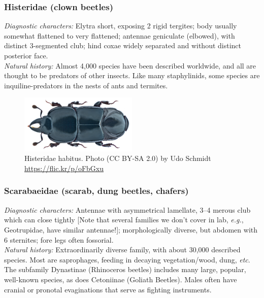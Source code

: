 \documentclass[letterpaper, 11pt]{article}
\begin{document}
\subsubsection{Histeridae (clown beetles)}
\noindent{}\textit{Diagnostic characters:} Elytra short, exposing 2 rigid tergites; body usually somewhat flattened to very flattened; antennae geniculate (elbowed), with distinct 3-segmented club; hind coxae widely separated and without distinct posterior face.\\

\noindent{}\textit{Natural history:} Almost 4,000 species have been described worldwide, and all are thought to be predators of other insects. Like many staphylinids, some species are inquiline-predators in the nests of ants and termites.

\begin{figure}[ht!]
  \centering
    \includegraphics[width=0.5\textwidth]{HisteridHabitus}
  \caption{Histeridae habitus. Photo (CC BY-SA 2.0) by Udo Schmidt \url{https://flic.kr/p/oFbGxu}}
  \label{fig:histerid}
\end{figure}

\subsubsection{Scarabaeidae (scarab, dung beetles, chafers)}
\noindent{}\textit{Diagnostic characters:} Antennae with asymmetrical lamellate, 3--4 merous club which can close tightly [Note that several families we don't cover in lab, \textit{e.g.}, Geotrupidae, have similar antennae!]; morphologically diverse, but abdomen with 6 sternites; fore legs often fossorial.\\

\noindent{}\textit{Natural history:} Extraordinarily diverse family, with about 30,000 described species. Most are saprophages, feeding in decaying vegetation/wood, dung, \textit{etc}. The subfamily Dynastinae (Rhinoceros beetles) includes many large, popular, well-known species, as does Cetoniinae (Goliath Beetles). Males often have cranial or pronotal evaginations that serve as fighting instruments.\\
\end{document}

